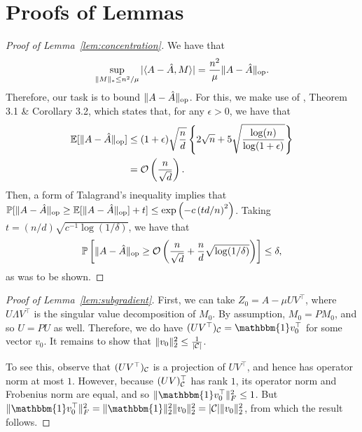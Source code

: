 \documentclass[11pt]{article}
\newcommand{\A}{\hat{A}}
\newcommand{\oo}{\mathcal{O}}
\newcommand{\bi}{\mathbbm{1}}
\begin{document}
\section{Proofs of Lemmas}

\begin{proof}[Proof of Lemma~\ref{lem:concentration}]
We have that 
\[ \sup_{\|M\|_* \leq n^2/\mu} |\langle A-\A, M \rangle| = \frac{n^2}{\mu}\|A-\A\|_{\op}. \]
Therefore, our task is to bound $\|A-\A\|_{\op}$. For this, we make use of \citet{bandeira2014sharp}, 
Theorem 3.1 \& Corollary 3.2, which states that, for any $\epsilon > 0$, we have that
\begin{align}
\bE[\|A-\A\|_{\op}] &\leq (1+\epsilon)\sqrt{\frac{n}{d}}\left\{2\sqrt{n} + 5\sqrt{\frac{\log(n)}{\log(1+\epsilon)}}\right\} \\
 &= \oo\p{\frac{n}{\sqrt{d}}}.
\end{align}
Then, a form of Talagrand's inequality implies that
$\bP[\|A-\A\|_{\op} \geq \bE[\|A-\A\|_{\op}] + t] \leq \exp\p{-c\p{td/n}^2}$. 
Taking $t = (n/d)\sqrt{c^{-1}\log(1/\delta)}$, we have that 
\[ \bP\left[\|A-\A\|_{\op} \geq \oo\p{\frac{n}{\sqrt{d}} + \frac{n}{d}\sqrt{\log(1/\delta)}}\right] \leq \delta, \]
as was to be shown.
\end{proof}

\begin{proof}[Proof of Lemma~\ref{lem:subgradient}]
First, we can take $Z_0 = A - \mu UV^{\top}$, where $U \Lambda V^{\top}$ is the singular 
value decomposition of $M_0$. By assumption, $M_0 = PM_0$, and so $U = PU$ as well. Therefore, 
we do have $(UV^{\top})_{\sC} = \bi v_0^{\top}$ for some vector $v_0$. It remains to show that 
$\|v_0\|_2^2 \leq \frac{1}{|\mathcal{C}|}$.

To see this, observe that $(UV^{\top})_{\mathcal{C}}$ is a projection of $UV^{\top}$, and hence 
has operator norm at most $1$. However, because $(UV)^{\top}_{\mathcal{C}}$ has rank $1$, its 
operator norm and Frobenius norm are equal, and so $\|\bi v_0^{\top}\|_F^2 \leq 1$. 
But $\|\bi v_0^{\top}\|_F^2 = \|\bi\|_2^2\|v_0\|_2^2 = |\sC|\|v_0\|_2^2$, from which 
the result follows.
\end{proof}



\end{document}

